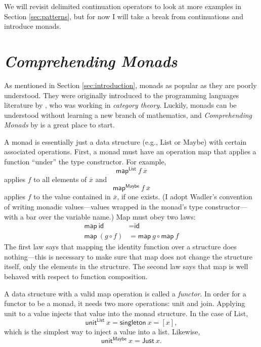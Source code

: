 \documentclass[acmsmall, nonacm, screen]{acmart}
\newcommand{\map}[3]{\textsf{map}^{\textsf{#1}}~#2~#3}
\newcommand{\unit}[2]{\textsf{unit}^{\textsf{#1}}~#2}
\begin{document}
We will revisit delimited continuation operators to look at more examples in Section
\ref{sec:patterns}, but for now I will take a break from continuations and introduce monads.

\section{{\em Comprehending Monads}} \label{sec:wadler}
As mentioned in Section \ref{sec:introduction}, monads as popular as they are poorly understood.
They were originally introduced to the programming languages literature by
\citet{moggi1991notions}, who was working in {\em category theory}. Luckily, monads can be
understood without learning a new branch of mathematics, and {\em Comprehending Monads} by
\citet{wadler1990comprehending} is a great place to start.

A monad is essentially just a data structure (e.g., \textsf{List} or \textsf{Maybe}) with certain
associated operations. First, a monad must have an operation \textsf{map} that applies a function
``under'' the type constructor. For example,
\[ \map{List}{f}{\overline{x}} \]
applies $f$ to all elements of $\overline{x}$ and 
\[ \map{Maybe}{f}{\overline{x}} \]
applies $f$ to the value contained in $\overline{x}$, if one exists. (I adopt Wadler's convention
of writing monadic values---values wrapped in the monad's type constructor---with a bar over the
variable name.) Map must obey two laws:
\begin{align*}
  \textsf{map}~\textsf{id} &= \textsf{id} \\
  \textsf{map}~(g \circ f) &= \textsf{map}~g \circ \textsf{map}~f
\end{align*}
The first law says that mapping the identity function over a structure does nothing---this is
necessary to make sure that \textsf{map} does not change the structure itself, only the elements
in the structure. The second law says that \textsf{map} is well behaved with respect to function
composition.

A data structure with a valid \textsf{map} operation is called a {\em functor}. In order for a
functor to be a monad, it needs two more operations: \textsf{unit} and \textsf{join}. Applying
\textsf{unit} to a value injects that value into the monad structure. In the case of
\textsf{List},
\[ \unit{List}{x} = \textsf{singleton}~x = [x], \]
which is the simplest way to inject a value into a list. Likewise,
\[ \unit{Maybe}{x} = \textsf{Just}~x. \]
\end{document}
